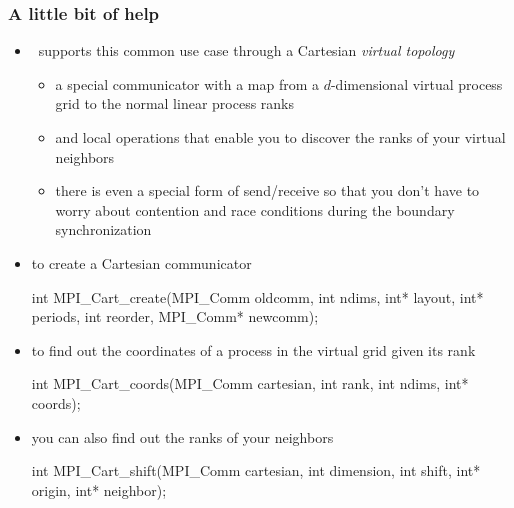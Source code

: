 \begin{frame}[fragile]
%
  \frametitle{A little bit of help}
%
  \begin{itemize}
%
  \item \mpi\ supports this common use case through a Cartesian {\em virtual topology}
    \begin{itemize}
    \item a special communicator with a map from a $d$-dimensional virtual process grid to the
      normal linear process ranks
    \item and local operations that enable you to discover the ranks of your virtual neighbors
    \item there is even a special form of send/receive so that you don't have to worry about
      contention and race conditions during the boundary synchronization
    \end{itemize}
%
  \item to create a Cartesian communicator
    \begin{C}
int MPI_Cart_create(MPI_Comm oldcomm,
        int ndims, int* layout, int* periods, int reorder, MPI_Comm* newcomm);
    \end{C}
%
  \item to find out the coordinates of a process in the virtual grid given its rank
    \begin{C}
int MPI_Cart_coords(MPI_Comm cartesian,
        int rank, int ndims, int* coords); 
    \end{C}
%
    \item you can also find out the ranks of your neighbors
    \begin{C}
int MPI_Cart_shift(MPI_Comm cartesian,
        int dimension, int shift, int* origin, int* neighbor); 
    \end{C}
%
  \end{itemize}
%
\end{frame}

